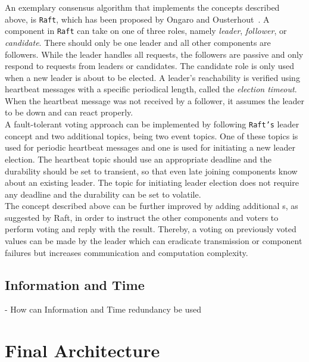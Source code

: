 An exemplary consensus algorithm that implements the concepts described above, is \texttt{Raft}, which has been proposed by Ongaro and Ousterhout~\cite{RaftConsensusPaper}.
A component in \texttt{Raft} can take on one of three roles, namely \textit{leader}, \textit{follower}, or \textit{candidate}.
There should only be one leader and all other components are followers.
While the leader handles all requests, the followers are passive and only respond to requests from leaders or candidates.
The candidate role is only used when a new leader is about to be elected.
A leader's reachability is verified using heartbeat messages with a specific periodical length, called the \textit{election timeout}.
When the heartbeat message was not received by a follower, it assumes the leader to be down and can react properly.
\\

A fault-tolerant voting approach can be implemented by following \texttt{Raft's} leader concept and two additional  topics, being two event topics.
One of these topics is used for periodic heartbeat messages and one is used for initiating a new leader election.
The heartbeat topic should use an appropriate deadline and the durability should be set to transient, so that even late joining components know about an existing leader.
The topic for initiating leader election does not require any deadline and the durability can be set to volatile.
\\

The concept described above can be further improved by adding additional s, as suggested by Raft, in order to instruct the other components and voters to perform voting and reply with the result.
Thereby, a voting on previously voted values can be made by the leader which can eradicate transmission or component failures but increases communication and computation complexity.



\subsection{Information and Time}
- How can Information and Time redundancy be used


\section{Final Architecture}


